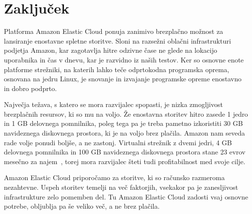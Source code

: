 %

\section{Zaključek}

Platforma Amazon Elastic Cloud ponuja zanimivo brezplačno možnost za lansiranje enostavne spletne storitve.
Sloni na razsežni oblačni infrastrukturi podjetja Amazon, kar zagotavlja hitre odzivne čase ne glede na lokacijo uporabnika in čas v dnevu, kar je razvidno iz naših testov.
Ker so osnovne enote platforme strežniki, na katerih lahko teče odprtokodna programska oprema, osnovana na jedru Linux, je snovanje in izvajanje programske opreme enostavno in dobro podprto.

Največja težava, s katero se mora razvijalec spopasti, je nizka zmogljivost brezplačnih resursov, ki so mu na voljo.
Že enostavna storitev hitro zasede 1 jedro in 1 GB delovnega pomnilnika, poleg tega pa je treba pametno izkoristiti 30 GB navideznega diskovnega prostora, ki je na voljo brez plačila.
Amazon nam seveda rade volje ponudi boljše, a ne zastonj.
Virtualni strežnik z dvemi jedri, 4 GB delovnega pomnilnika in 100 GB navideznega diskovnega prostora stane 23 evrov mesečno za najem~\cite{1_aws_pricing}, torej mora razvijalec šteti tudi profitabilnost med svoje cilje.

Amazon Elastic Cloud priporočamo za storitve, ki so računsko razmeroma nezahtevne.
Uspeh storitev temelji na več faktorjih, vsekakor pa je zanesljivost infrastrukture zelo pomemben del.
Tu Amazon Elastic Cloud zadosti vsaj osnovne potrebe, obljublja pa še veliko več, a ne brez plačila.

